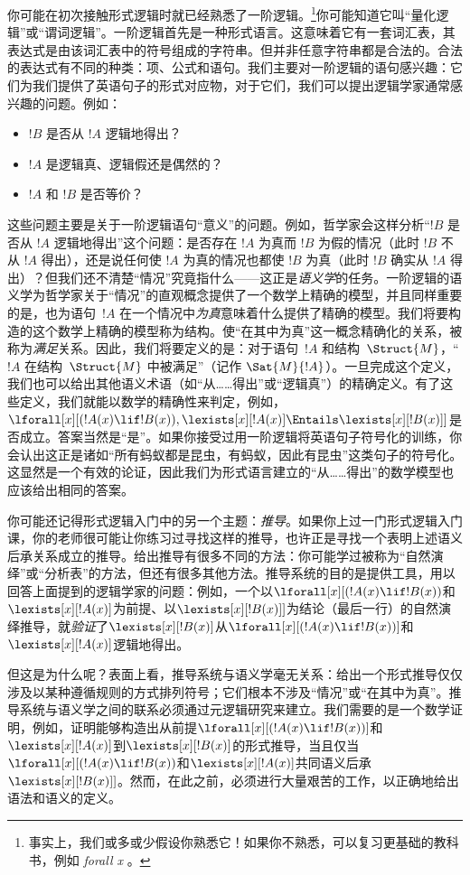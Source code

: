 \documentclass[../../../include/open-logic-section]{subfiles}
\begin{document}


你可能在初次接触形式逻辑时就已经熟悉了一阶逻辑。\footnote{事实上，我们或多或少假设你熟悉它！如果你不熟悉，可以复习更基础的教科书，例如 \emph{forall x} \citep{Magnus2021}。}你可能知道它叫“量化逻辑”或“谓词逻辑”。一阶逻辑首先是一种形式语言。这意味着它有一套词汇表，其表达式是由该词汇表中的符号组成的字符串。但并非任意字符串都是合法的。合法的表达式有不同的种类：项、公式和语句。我们主要对一阶逻辑的语句感兴趣：它们为我们提供了英语句子的形式对应物，对于它们，我们可以提出逻辑学家通常感兴趣的问题。例如：

\begin{itemize}
    \item $!B$ 是否从 $!A$ 逻辑地得出？
    \item $!A$ 是逻辑真、逻辑假还是偶然的？
    \item $!A$ 和 $!B$ 是否等价？
\end{itemize}

这些问题主要是关于一阶逻辑语句“意义”的问题。例如，哲学家会这样分析“$!B$ 是否从 $!A$ 逻辑地得出”这个问题：是否存在 $!A$ 为真而 $!B$ 为假的情况（此时 $!B$ 不从 $!A$ 得出），还是说任何使 $!A$ 为真的情况也都使 $!B$ 为真（此时 $!B$ 确实从 $!A$ 得出）？但我们还不清楚“情况”究竟指什么——这正是\emph{语义学}的任务。一阶逻辑的语义学为哲学家关于“情况”的直观概念提供了一个数学上精确的模型，并且同样重要的是，也为语句~$!A$ 在一个情况中\emph{为真}意味着什么提供了精确的模型。我们将要构造的这个数学上精确的模型称为结构。使“在其中为真”这一概念精确化的关系，被称为\emph{满足}关系。因此，我们将要定义的是：对于语句~$!A$ 和结构~$\Struct{M}$，“$!A$ 在结构~$\Struct{M}$ 中被满足”（记作 $\Sat{M}{!A}$）。一旦完成这个定义，我们也可以给出其他语义术语（如“从……得出”或“逻辑真”）的精确定义。有了这些定义，我们就能以数学的精确性来判定，例如，$\lforall[x][(!A(x) \lif !B(x)),
\lexists[x][!A(x)] \Entails \lexists[x][!B(x)]]$是否成立。答案当然是“是”。如果你接受过用一阶逻辑将英语句子符号化的训练，你会认出这正是诸如“所有蚂蚁都是昆虫，有蚂蚁，因此有昆虫”这类句子的符号化。这显然是一个有效的论证，因此我们为形式语言建立的“从……得出”的数学模型也应该给出相同的答案。

你可能还记得形式逻辑入门中的另一个主题：\emph{推导}。如果你上过一门形式逻辑入门课，你的老师很可能让你练习过寻找这样的推导，也许正是寻找一个表明上述语义后承关系成立的推导。给出推导有很多不同的方法：你可能学过被称为“自然演绎”或“分析表”的方法，但还有很多其他方法。推导系统的目的是提供工具，用以回答上面提到的逻辑学家的问题：例如，一个以$\lforall[x][(!A(x) \lif !B(x))$和$\lexists[x][!A(x)]$为前提、以$\lexists[x][!B(x)]]$为结论（最后一行）的自然演绎推导，就\emph{验证}了$\lexists[x][!B(x)]$从$\lforall[x][(!A(x) \lif !B(x))]$和$\lexists[x][!A(x)]$逻辑地得出。

但这是为什么呢？表面上看，推导系统与语义学毫无关系：给出一个形式推导仅仅涉及以某种遵循规则的方式排列符号；它们根本不涉及“情况”或“在其中为真”。推导系统与语义学之间的联系必须通过元逻辑研究来建立。我们需要的是一个数学证明，例如，证明能够构造出从前提$\lforall[x][(!A(x) \lif !B(x))]$和$\lexists[x][!A(x)]$到$\lexists[x][!B(x)]$的形式推导，当且仅当$\lforall[x][(!A(x)
\lif !B(x))$和$\lexists[x][!A(x)]$共同语义后承$\lexists[x][!B(x)]]$。然而，在此之前，必须进行大量艰苦的工作，以正确地给出语法和语义的定义。
\end{document}
